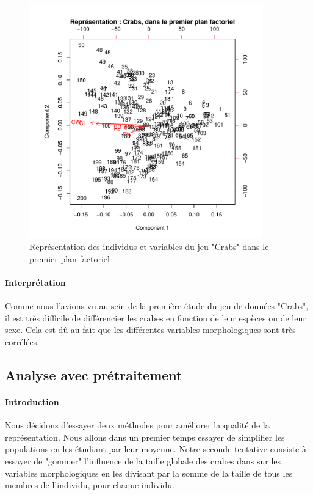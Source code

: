 \documentclass{report}
\begin{document}
\begin{figure}[h!]
\begin{center}
    \includegraphics[width=0.9\textwidth]{biplotcrabs.pdf}
    \caption{Représentation des individus et variables du jeu "Crabs" dans le premier plan factoriel}
\end{center}
\end{figure}
\paragraph{Interprétation}
Comme nous l'avions vu au sein de la première étude du jeu de données "Crabs", il est très difficile de différencier les crabes en fonction de leur espèces ou de leur sexe. Cela est dû au fait que les différentes variables morphologiques sont très corrélées.
\subsection{Analyse avec prétraitement}
\paragraph{Introduction}
Nous décidons d'essayer deux méthodes pour améliorer la qualité de la représentation. Nous allons dans un premier temps essayer de simplifier les populations en les étudiant par leur moyenne. Notre seconde tentative consiste à essayer de "gommer" l'influence de la taille globale des crabes dans sur les variables morphologiques en les divisant par la somme de la taille de tous les membres de l'individu, pour chaque individu.
\end{document}
